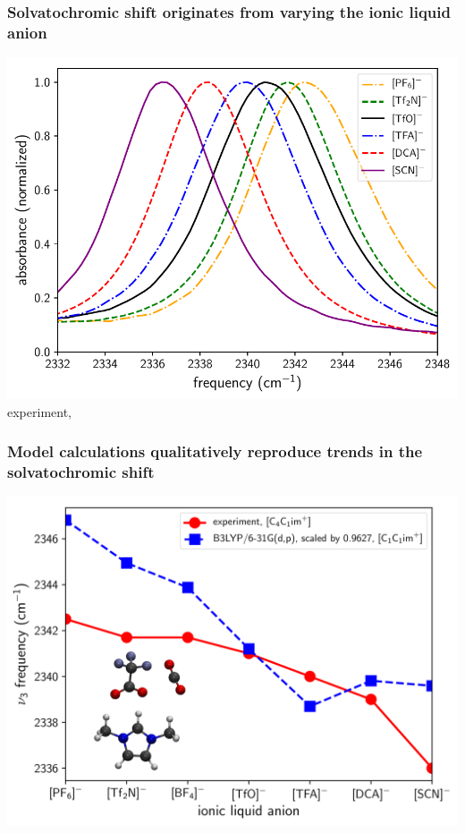 \documentclass[%
    xcolor=usenames,dvipsnames,svgnames%
]{beamer}
\begin{document}
\begin{frame}
  \frametitle{Solvatochromic shift originates from varying the ionic liquid anion}
  \centering
  \includegraphics[scale=0.65]{./figures/experimental_spectra_shifting.pdf}
  \scriptsize
  experiment, \ce{[C4C1im]+}
\end{frame}

\begin{frame}
  \frametitle{Model calculations qualitatively reproduce trends in the solvatochromic shift}
  \centering
  \includegraphics[width=\linewidth,keepaspectratio]{./figures/frequencies_calc_vs_expt1_combined.pdf}
\end{frame}
\end{document}
